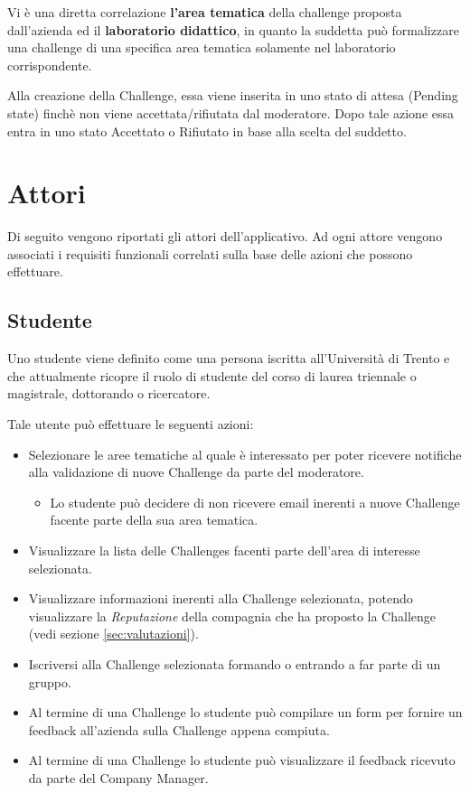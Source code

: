 Vi è una diretta correlazione \textbf{l'area tematica} della challenge proposta dall'azienda ed il \textbf{laboratorio didattico}, in quanto la suddetta può formalizzare una challenge di una specifica area tematica solamente nel laboratorio corrispondente.

Alla creazione della Challenge, essa viene inserita in uno stato di attesa (Pending state) finchè non viene accettata/rifiutata dal moderatore. Dopo tale azione essa entra in uno stato Accettato o Rifiutato in base alla scelta del suddetto.

\section{Attori}
Di seguito vengono riportati gli attori dell'applicativo. Ad ogni attore vengono associati i requisiti funzionali correlati sulla base delle azioni che possono effettuare.

\subsection{Studente}
Uno studente viene definito come una persona iscritta all'Università di Trento e che attualmente ricopre il ruolo di studente del corso di laurea triennale o magistrale, dottorando o ricercatore.

Tale utente può effettuare le seguenti azioni:

\begin{itemize}
    \item Selezionare le aree tematiche al quale è interessato per poter ricevere notifiche alla validazione di nuove Challenge da parte del moderatore.
        \begin{itemize}
            \item Lo studente può decidere di non ricevere email inerenti a nuove Challenge facente parte della sua area tematica.
        \end{itemize}
    \item Visualizzare la lista delle Challenges facenti parte dell'area di interesse selezionata.
    \item Visualizzare informazioni inerenti alla Challenge selezionata, potendo visualizzare la \textit{Reputazione} della compagnia che ha proposto la Challenge (vedi sezione \ref{sec:valutazioni}).
    \item Iscriversi alla Challenge selezionata formando o entrando a far parte di un gruppo.
    \item Al termine di una Challenge lo studente può compilare un form per fornire un feedback all'azienda sulla Challenge appena compiuta. 
    \item Al termine di una Challenge lo studente può visualizzare il feedback ricevuto da parte del Company Manager.
\end{itemize}


